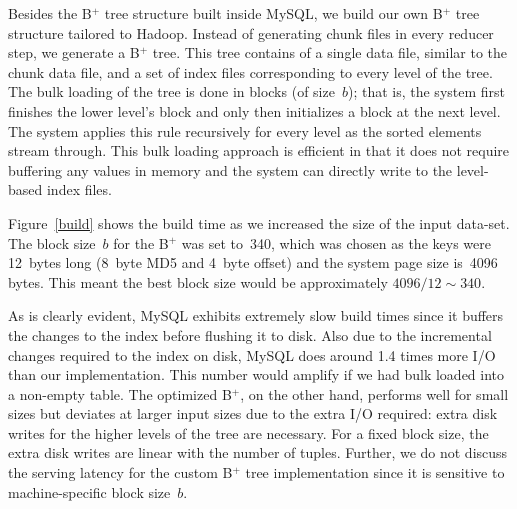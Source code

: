 Besides the B$^{+}$ tree structure built inside MySQL, we build our
own B$^{+}$ tree structure tailored to Hadoop. Instead of generating
chunk files in every reducer step, we generate a B$^{+}$ tree. This
tree contains of a single data file, similar to the chunk data file,
and a set of index files corresponding to every level of the tree. The
bulk loading of the tree is done in blocks (of size~$b$); that is, the
system first finishes the lower level's block and only then
initializes a block at the next level. The system applies this rule
recursively for every level as the sorted elements stream through.
This bulk loading approach is efficient in that it does not require
buffering any values in memory and the system can directly write to
the level-based index files. 

Figure~\ref{build} shows the build time as we increased the size of
the input data-set. The block size~$b$ for the B$^{+}$ was set to~340,
which was chosen as the keys were 12~bytes long (8~byte MD5 and 4~byte
offset) and the system page size is~4096 bytes. This meant the best
block size would be approximately $4096/12 \sim 340$. 

As is clearly evident, MySQL exhibits extremely slow build times since it buffers
the changes to the index before flushing it to disk. Also due to the
incremental changes required to the index on disk, MySQL does around
1.4 times more I/O than our implementation. This number would amplify 
if we had bulk loaded into a non-empty table. The optimized B$^{+}$, 
on the other hand, performs well for small sizes but deviates at larger 
input sizes due to the extra I/O required: extra disk writes for the 
higher levels of the tree are necessary. For a fixed block size, 
the extra disk writes are linear with the number of tuples. 
Further, we do not discuss the serving latency for the custom B$^{+}$ tree 
implementation since it is sensitive to machine-specific block size~$b$.

